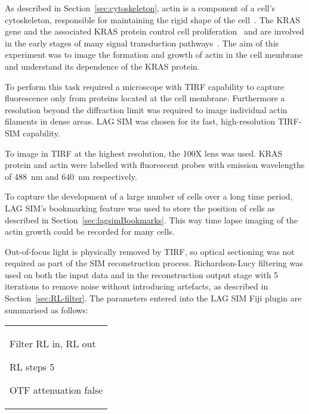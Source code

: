 As described in Section~\ref{sec:cytoskeleton}, actin is a component of a cell's cytoskeleton, responsible for maintaining the rigid shape of the cell~\cite{alberts2013essential}. 
The KRAS gene and the associated KRAS protein control cell proliferation~\cite{zimmermann2013small} and are involved in the early stages of many signal transduction pathways~\cite{downward2003targeting, kranenburg2005kras}. 
The aim of this experiment was to image the formation and growth of actin in the cell membrane and understand its dependence of the KRAS protein. 

To perform this task required a microscope with TIRF capability to capture fluorescence only from proteins located at the cell membrane. 
Furthermore a resolution beyond the diffraction limit was required to image individual actin filaments in dense areas. 
LAG SIM was chosen for its fast, high-resolution TIRF-SIM capability. 

To image in TIRF at the highest resolution, the 100X  lens was used. 
KRAS protein and actin were labelled with fluorescent probes with emission wavelengths of \SI{488}{\nano\metre} and \SI{640}{\nano\metre} respectively. 
 
To capture the development of a large number of cells over a long time period, LAG SIM's bookmarking feature was used to store the position of cells as described in Section~\ref{sec:lagsimBookmarks}.
This way time lapse imaging of the actin growth could be recorded for many cells.

Out-of-focus light is physically removed by TIRF, so optical sectioning was not required as part of the SIM reconstruction process.
Richardson-Lucy filtering was used on both the input data and in the reconstruction output stage with 5 iterations to remove noise without introducing artefacts, as described in Section~\ref{sec:RL-filter}.
The parameters entered into the LAG SIM Fiji plugin are summarised as follows: \newline 
\begin{tabular}{p{}}
\begin{labelling}[margin=OTF attenuation]
	\item[Filter] RL in, RL out
	\item[RL steps] 5
	\item[OTF attenuation] false
\end{labelling}
\end{tabular}

